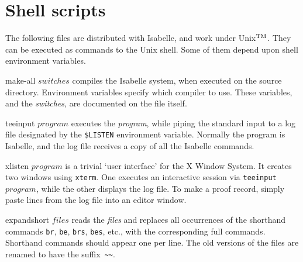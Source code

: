 \section{Shell scripts}
 The following files are distributed with
Isabelle, and work under Unix$^{\rm TM}$.  They can be executed as commands
to the Unix shell.  Some of them depend upon shell environment variables.
\begin{ttdescription}
\item[make-all $switches$] 
  compiles the Isabelle system, when executed on the source directory.
  Environment variables specify which \ML{} compiler to use.  These
  variables, and the {\it switches}, are documented on the file itself.

\item[teeinput $program$] 
  executes the {\it program}, while piping the standard input to a log file
  designated by the \verb|$LISTEN| environment variable.  Normally the
  program is Isabelle, and the log file receives a copy of all the Isabelle
  commands.

\item[xlisten $program$] 
  is a trivial `user interface' for the X Window System.  It creates two
  windows using {\tt xterm}.  One executes an interactive session via
  \hbox{\tt teeinput $program$}, while the other displays the log file.  To
  make a proof record, simply paste lines from the log file into an editor
  window.

\item[expandshort $files$]  
  reads the {\it files\/} and replaces all occurrences of the shorthand
  commands {\tt br}, {\tt be}, {\tt brs}, {\tt bes}, etc., with the
  corresponding full commands.  Shorthand commands should appear one
  per line.  The old versions of the files
  are renamed to have the suffix~\verb'~~'.
\end{ttdescription}

